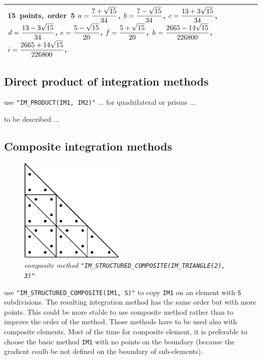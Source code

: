 \documentclass[11pt,a4paper]{article}
\begin{document}
\begin{tabular}{|m{2.5cm}|m{5.5cm}|m{1.2cm}|m{6cm}|}
    \mbox{15 points, order 5} \hspace{7em}
    \mbox{$a = {\displaystyle \frac{\displaystyle 7 + \sqrt{15}}{\displaystyle 34}}$,}
    \mbox{$b = {\displaystyle \frac{\displaystyle 7 - \sqrt{15}}{\displaystyle 34}}$,}\hspace{5em}
    \mbox{$c = {\displaystyle \frac{\displaystyle 13 + 3\sqrt{15}}{\displaystyle 34}}$,}
    \mbox{$d = {\displaystyle \frac{\displaystyle 13 - 3\sqrt{15}}{\displaystyle 34}}$,}\hspace{5em}
    \mbox{$e = {\displaystyle \frac{\displaystyle 5 - \sqrt{15}}{\displaystyle 20}}$,}
    \mbox{$f = {\displaystyle \frac{\displaystyle 5 + \sqrt{15}}{\displaystyle 20}}$,}\hspace{5em}
    \mbox{$h = {\displaystyle \frac{\displaystyle 2665 - 14\sqrt{15}}{\displaystyle 226800}}$,}\hspace{5em} 
    \mbox{$i = {\displaystyle \frac{\displaystyle 2665 + 14\sqrt{15}}{\displaystyle 226800}}$,}\hspace{5em} 
  \\ \hline
\end{tabular}

\subsection{Direct product of integration methods}

use {\tt "IM\_PRODUCT(IM1, IM2)"} ... for quadrilateral or prisms ...
 
to be described ...

\subsection{Composite integration methods}

\begin{figure}[H]
  \begin{center}
    \includegraphics[width=5cm,angle=0]{getfemlist_intmethod_triangle2_comp.eps}
  \end{center}
  \caption{ \it composite method {\tt "IM\_STRUCTURED\_COMPOSITE(IM\_TRIANGLE(2), 3)"}} 
  \label{fig:triangle_comp}
\end{figure}


use {\tt "IM\_STRUCTURED\_COMPOSITE(IM1, S)"} to copy {\tt IM1} on an element with {\tt S} subdivisions. The resulting integration method has the same order but with more points. This could be more stable to use composite method rather than to improve the order of the method. Those methods have to be used also with composite elements. Most of the time for composite element, it is preferable to choose the basic method {\tt IM1} with no points on the boundary (because the gradient coulb be not defined on the boundary of sub-elements). 
\end{document}
